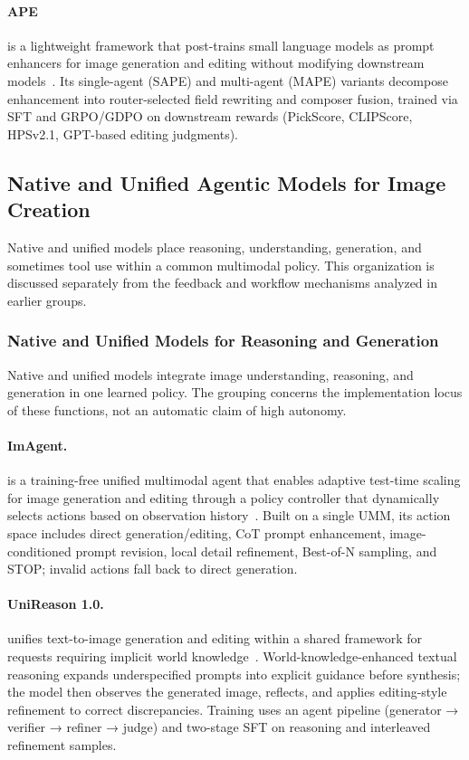 \paragraph{APE}
 is a lightweight framework that post-trains small language models as prompt enhancers for image generation and editing  without modifying downstream models~\cite{avg260600204}. Its single-agent (SAPE) and multi-agent (MAPE) variants decompose enhancement into router-selected field rewriting and composer fusion, trained via SFT and GRPO/GDPO on downstream rewards (PickScore, CLIPScore, HPSv2.1, GPT-based editing judgments). 


\subsection{Native and Unified Agentic Models for Image Creation}
Native and unified models place reasoning, understanding, generation, and sometimes tool use within a common multimodal policy. This organization is discussed separately from the feedback and workflow mechanisms analyzed in earlier groups.

\subsubsection{Native and Unified Models for Reasoning and Generation}
Native and unified models integrate image understanding, reasoning, and generation in one learned policy. The grouping concerns the implementation locus of these functions, not an automatic claim of high autonomy.

\paragraph{ImAgent.}
 is a training-free unified multimodal agent that enables adaptive test-time scaling for image generation and editing through a policy controller that dynamically selects actions based on observation history~\cite{avg251111483}. Built on a single UMM, its action space includes direct generation/editing, CoT prompt enhancement, image-conditioned prompt revision, local detail refinement, Best-of-N sampling, and STOP; invalid actions fall back to direct generation. 

\paragraph{UniReason 1.0.}
 unifies text-to-image generation and editing within a shared framework for requests requiring implicit world knowledge~\cite{avg260202437}. World-knowledge-enhanced textual reasoning expands underspecified prompts into explicit guidance before synthesis; the model then observes the generated image, reflects, and applies editing-style refinement to correct discrepancies. Training uses an agent pipeline (generator → verifier → refiner → judge) and two-stage SFT on reasoning and interleaved refinement samples.

